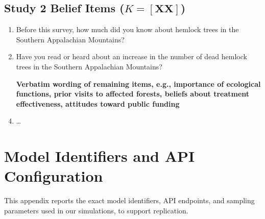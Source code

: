 \documentclass[12pt]{article}
\begin{document}
\subsection{Study 2 Belief Items ($K = [\textbf{XX}]$)}

\begin{enumerate}[label=Q\arabic*., leftmargin=*]
    \item Before this survey, how much did you know about hemlock trees in the Southern Appalachian Mountains?
    \item Have you read or heard about an increase in the number of dead hemlock trees in the Southern Appalachian Mountains?
    \item [\textbf{Verbatim wording of remaining items, e.g., importance of ecological functions, prior visits to affected forests, beliefs about treatment effectiveness, attitudes toward public funding}]
    \item \dots
\end{enumerate}

\section{Model Identifiers and API Configuration}\label{app:model-ids}

This appendix reports the exact model identifiers, API endpoints, and sampling parameters used in our simulations, to support replication.
\end{document}
